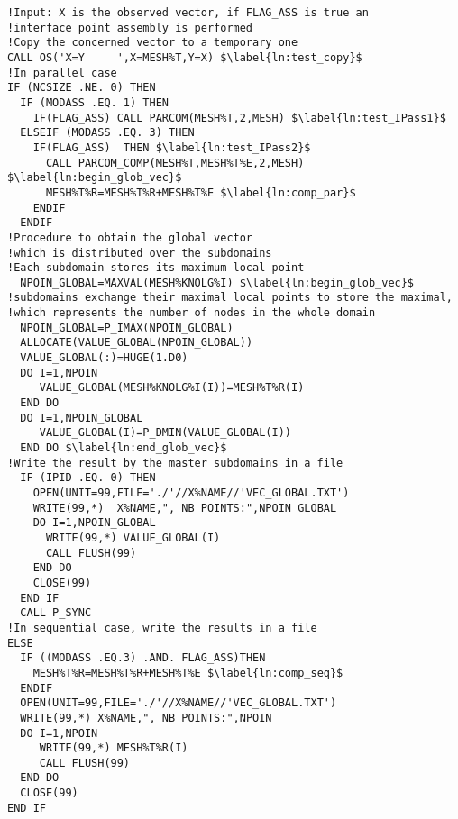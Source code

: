 \begin{lstlisting}[language=TelFortran, caption={The BIEF\_OBJ structure in \texttt{glob\_vec}},label={lst:GlobVec},escapechar=\$]
!Input: X is the observed vector, if FLAG_ASS is true an
!interface point assembly is performed
!Copy the concerned vector to a temporary one
CALL OS('X=Y     ',X=MESH%T,Y=X) $\label{ln:test_copy}$
!In parallel case
IF (NCSIZE .NE. 0) THEN
  IF (MODASS .EQ. 1) THEN
    IF(FLAG_ASS) CALL PARCOM(MESH%T,2,MESH) $\label{ln:test_IPass1}$
  ELSEIF (MODASS .EQ. 3) THEN
    IF(FLAG_ASS)  THEN $\label{ln:test_IPass2}$
      CALL PARCOM_COMP(MESH%T,MESH%T%E,2,MESH)   $\label{ln:begin_glob_vec}$
      MESH%T%R=MESH%T%R+MESH%T%E $\label{ln:comp_par}$
    ENDIF
  ENDIF
!Procedure to obtain the global vector
!which is distributed over the subdomains
!Each subdomain stores its maximum local point
  NPOIN_GLOBAL=MAXVAL(MESH%KNOLG%I) $\label{ln:begin_glob_vec}$
!subdomains exchange their maximal local points to store the maximal,
!which represents the number of nodes in the whole domain
  NPOIN_GLOBAL=P_IMAX(NPOIN_GLOBAL)
  ALLOCATE(VALUE_GLOBAL(NPOIN_GLOBAL))
  VALUE_GLOBAL(:)=HUGE(1.D0)
  DO I=1,NPOIN
     VALUE_GLOBAL(MESH%KNOLG%I(I))=MESH%T%R(I)
  END DO
  DO I=1,NPOIN_GLOBAL
     VALUE_GLOBAL(I)=P_DMIN(VALUE_GLOBAL(I))
  END DO $\label{ln:end_glob_vec}$
!Write the result by the master subdomains in a file
  IF (IPID .EQ. 0) THEN
    OPEN(UNIT=99,FILE='./'//X%NAME//'VEC_GLOBAL.TXT')
    WRITE(99,*)  X%NAME,", NB POINTS:",NPOIN_GLOBAL
    DO I=1,NPOIN_GLOBAL
      WRITE(99,*) VALUE_GLOBAL(I)
      CALL FLUSH(99)
    END DO
    CLOSE(99)
  END IF
  CALL P_SYNC
!In sequential case, write the results in a file
ELSE
  IF ((MODASS .EQ.3) .AND. FLAG_ASS)THEN
    MESH%T%R=MESH%T%R+MESH%T%E $\label{ln:comp_seq}$
  ENDIF
  OPEN(UNIT=99,FILE='./'//X%NAME//'VEC_GLOBAL.TXT')
  WRITE(99,*) X%NAME,", NB POINTS:",NPOIN
  DO I=1,NPOIN
     WRITE(99,*) MESH%T%R(I)
     CALL FLUSH(99)
  END DO
  CLOSE(99)
END IF
\end{lstlisting}
%

